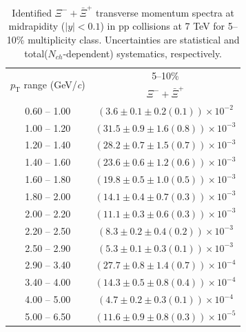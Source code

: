 \begin{table}
\caption{Identified $\Xi^{-} + \bar{\Xi}^{+}$ transverse momentum spectra at midrapidity ($|y|<0.1$) in pp collisions at 7 TeV for 5--10\% multiplicity class. Uncertainties are statistical and total($N_{ch}$-dependent) systematics, respectively.}
\label{tab:XiSum_5to10}
\begin{center}
\begin{tabular}{ c | c }
\hline
\multirow{2}{*}{$p_{\mathrm{T}}$ range (GeV/\textit{c})} & \multicolumn{1}{c}{5--10\%} \\ & $\Xi^{-} + \bar{\Xi}^{+}$\\ 
\hline
0.60 -- 1.00 & $(3.6\pm0.1\pm0.2(0.1))\times10^{-2}$ \\ 
1.00 -- 1.20 & $(31.5\pm0.9\pm1.6(0.8))\times10^{-3}$ \\ 
1.20 -- 1.40 & $(28.2\pm0.7\pm1.5(0.7))\times10^{-3}$ \\ 
1.40 -- 1.60 & $(23.6\pm0.6\pm1.2(0.6))\times10^{-3}$ \\ 
1.60 -- 1.80 & $(19.8\pm0.5\pm1.0(0.5))\times10^{-3}$ \\ 
1.80 -- 2.00 & $(14.1\pm0.4\pm0.7(0.3))\times10^{-3}$ \\ 
2.00 -- 2.20 & $(11.1\pm0.3\pm0.6(0.3))\times10^{-3}$ \\ 
2.20 -- 2.50 & $(8.3\pm0.2\pm0.4(0.2))\times10^{-3}$ \\ 
2.50 -- 2.90 & $(5.3\pm0.1\pm0.3(0.1))\times10^{-3}$ \\ 
2.90 -- 3.40 & $(27.7\pm0.8\pm1.4(0.7))\times10^{-4}$ \\ 
3.40 -- 4.00 & $(14.3\pm0.5\pm0.8(0.4))\times10^{-4}$ \\ 
4.00 -- 5.00 & $(4.7\pm0.2\pm0.3(0.1))\times10^{-4}$ \\ 
5.00 -- 6.50 & $(11.6\pm0.9\pm0.8(0.3))\times10^{-5}$ \\ 
\hline
\end{tabular}
\end{center}
\end{table}
 
